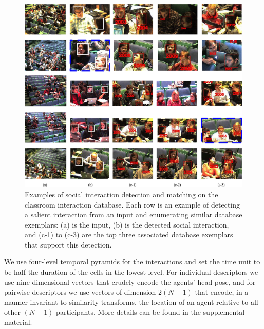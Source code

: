 \begin{figure}
\begin{center}
\includegraphics[scale=2.25]{retrieved.png}
\end{center}
\vspace{-10pt}
\caption{Examples of social interaction detection and matching on the classroom interaction database. Each row is an example of detecting a salient interaction from an input and enumerating similar database exemplars: (a) is the input, (b) is the detected social interaction, and (c-1) to (c-3) are the top three associated database exemplars that support this detection.}
\label{retrieved}
\end{figure}

We use four-level temporal pyramids for the interactions and set the time unit to be half the duration of the cells in the lowest level. For individual descriptors we use nine-dimensional vectors that crudely encode the agents' head pose, and for pairwise descriptors we use vectors of dimension $2(N-1)$ that encode, in a manner invariant to similarity transforms, the location of an agent relative to all other $(N-1)$ participants. More details can be found in the supplemental material.


